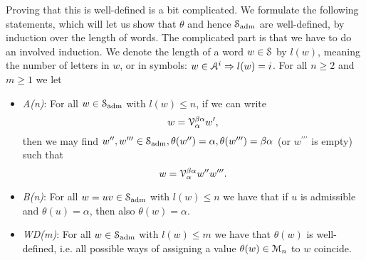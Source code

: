 \begin{defn}
Proving that this is well-defined is a bit complicated. We formulate the following statements, which will let us show that $\theta$ and hence $\mathcal{S}_{\mathrm{adm}}$ are well-defined, by induction over the length of words.  The complicated part is that we have to do an involved induction. We denote the length of a word $w \in \mathcal{S}$ by $l(w)$, meaning the number of letters in $w$, or in symbols: $w \in \mathcal{A}^i \Rightarrow l(w) = i$.
For all $n \geq 2$ and $m \geq 1$ we let
\begin{itemize}
\item[] \emph{A(n)}: For all $w \in \mathcal{S}_{\mathrm{adm}}$ with $l(w) \leq n$, if we can write
	\begin{equation*}
	w = \mathcal{V}^{\beta\alpha}_\alpha w^\prime,
	\end{equation*}
	then we may find 	$w^{\prime\prime}, w^{\prime\prime\prime} \in \mathcal{S}_{\mathrm{adm}}, \theta(w^{\prime\prime}) = \alpha, \theta(w^{\prime\prime\prime}) = \beta\alpha$ (or $w^{\prime\prime\prime}$ is empty) such that
	\begin{equation*}
	w = \mathcal{V}_\alpha^{\beta\alpha} w^{\prime\prime} w^{\prime\prime\prime}.
	\end{equation*}
\item[] \emph{B(n)}: For all $w = uv \in \mathcal{S}_{\mathrm{adm}}$ with $l(w) \leq n$ we have that if $u$ is admissible and $\theta(u) = \alpha$, then also $\theta(w) = \alpha$.
\item[] \emph{WD(m)}: For all $w \in \mathcal{S}_{\mathrm{adm}}$ with $l(w) \leq m$ we have that $\theta(w)$ is well-defined, i.e. all possible ways of assigning a value $\theta(w) \in \mathcal{M}_n$ to $w$ coincide.
\end{itemize}
\end{defn}
%
%
